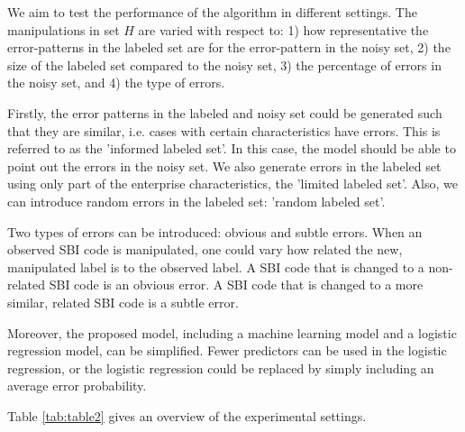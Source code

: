 \documentclass[12pt, a4paper, titlepage]{article}
\begin{document}

We aim to test the performance of the algorithm in different settings. The manipulations in set $H$ are varied with respect to: 1) how representative the error-patterns in the labeled set are for the error-pattern in the noisy set, 2) the size of the labeled set compared to the noisy set, 3) the percentage of errors in the noisy set, and 4) the type of errors. 

Firstly, the error patterns in the labeled and noisy set could be generated such that they are similar, i.e. cases with certain characteristics have errors. This is referred to as the 'informed labeled set'. In this case, the model should be able to point out the errors in the noisy set. We also generate errors in the labeled set using only part of the enterprise characteristics, the 'limited labeled set'. Also, we can introduce random errors in the labeled set: 'random labeled set'. 

Two types of errors can be introduced: obvious and subtle errors. When an observed SBI code is manipulated, one could vary how related the new, manipulated label is to the observed label. A SBI code that is changed to a non-related SBI code is an obvious error. A SBI code that is changed to a more similar, related SBI code is a subtle error.

Moreover, the proposed model, including a machine learning model and a logistic regression model, can be simplified. Fewer predictors can be used in the logistic regression, or the logistic regression could be replaced by simply including an average error probability.


Table \ref{tab:table2} gives an overview of the experimental settings. 
\end{document}
